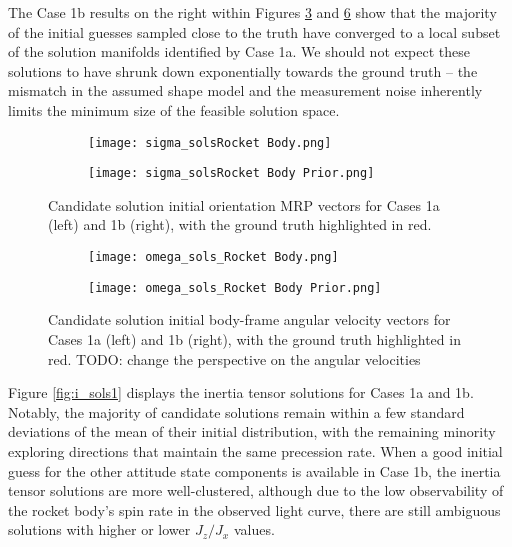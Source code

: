 \documentclass[a4paper,twocolumn]{spaceDebrisC} %
\begin{document}
The Case 1b results on the right within Figures \ref{fig:sigma_sols1} and \ref{fig:omega_sols1} show that the majority of the initial guesses sampled close to the truth have converged to a local subset of the solution manifolds identified by Case 1a. We should not expect these solutions to have shrunk down exponentially towards the ground truth -- the mismatch in the assumed shape model and the measurement noise inherently limits the minimum size of the feasible solution space.

\begin{figure}[H]
  \centering
  \begin{subfigure}[t]{0.23\textwidth}
    \centering
    \texttt{[image: sigma\_solsRocket Body.png]}
    \caption{}
    \label{fig:sigma_sols1a}
  \end{subfigure}
  \hfill
  \begin{subfigure}[t]{0.23\textwidth}
    \centering
    \texttt{[image: sigma\_solsRocket Body Prior.png]}
    \caption{}
    \label{fig:sigma_sols1b}
  \end{subfigure}

  \caption{Candidate solution initial orientation MRP vectors for Cases 1a (left) and 1b (right), with the ground truth highlighted in red.}
  \label{fig:sigma_sols1}
\end{figure}

\begin{figure}[H]
  \centering
  \begin{subfigure}[t]{0.23\textwidth}
    \centering
    \texttt{[image: omega\_sols\_Rocket Body.png]}
    \caption{}
    \label{fig:omega_sols1a}
  \end{subfigure}
  \hfill
  \begin{subfigure}[t]{0.23\textwidth}
    \centering
    \texttt{[image: omega\_sols\_Rocket Body Prior.png]}
    \caption{}
    \label{fig:omega_sols1b}
  \end{subfigure}
  \caption{Candidate solution initial body-frame angular velocity vectors for Cases 1a (left) and 1b (right), with the ground truth highlighted in red. TODO: change the perspective on the angular velocities}
  \label{fig:omega_sols1}
\end{figure}

Figure \ref{fig:i_sols1} displays the inertia tensor solutions for Cases 1a and 1b. Notably, the majority of candidate solutions remain within a few standard deviations of the mean of their initial distribution, with the remaining minority exploring directions that maintain the same precession rate. When a good initial guess for the other attitude state components is available in Case 1b, the inertia tensor solutions are more well-clustered, although due to the low observability of the rocket body's spin rate in the observed light curve, there are still ambiguous solutions with higher or lower $J_z / J_x$ values.
\end{document}
